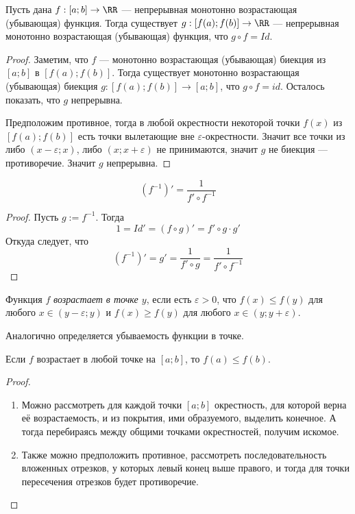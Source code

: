 \documentclass[12pt,a4paper]{article}
\begin{document}
    \begin{lemma}
        Пусть дана $f: [a; b] \to \RR$ --- непрерывная монотонно возрастающая (убывающая) функция. Тогда существует $g: [f(a); f(b)] \to \RR$ --- непрерывная монотонно возрастающая (убывающая) функция, что $g \circ f = Id$.
    \end{lemma}

    \begin{proof}
        Заметим, что $f$ --- монотонно возрастающая (убывающая) биекция из $[a; b]$ в $[f(a); f(b)]$. Тогда существует монотонно возрастающая (убывающая) биекция $g: [f(a); f(b)] \to [a; b]$, что $g \circ f = id$. Осталось показать, что $g$ непрерывна.

        Предположим противное, тогда в любой окрестности некоторой точки $f(x)$ из $[f(a); f(b)]$ есть точки вылетающие вне $\varepsilon$-окрестности. Значит все точки из либо $(x - \varepsilon; x)$, либо $(x; x + \varepsilon)$ не принимаются, значит $g$ не биекция --- противоречие. Значит $g$ непрерывна.
    \end{proof}

    \begin{lemma}
        \[(f^{-1})' = \frac{1}{f' \circ f^{-1}}\]
    \end{lemma}

    \begin{proof}
        Пусть $g := f^{-1}$. Тогда
        \[1 = Id' = (f \circ g)' = f' \circ g \cdot g'\]
        Откуда следует, что
        \[(f^{-1})' = g' = \frac{1}{f' \circ g} = \frac{1}{f' \circ f^{-1}}\]
    \end{proof}

    \begin{definition}
        Функция $f$ \emph{возрастает в точке $y$}, если есть $\varepsilon > 0$, что $f(x) \leqslant f(y)$ для любого $x \in (y-\varepsilon; y)$ и $f(x) \geqslant f(y)$ для любого $x \in (y; y+\varepsilon)$.

        Аналогично определяется убываемость функции в точке.
    \end{definition}

    \begin{lemma}
        Если $f$ возрастает в любой точке на $[a;b]$, то $f(a) \leqslant f(b)$.
    \end{lemma}

    \begin{proof}
        \begin{enumerate}\ 
            \item Можно рассмотреть для каждой точки $[a; b]$ окрестность, для которой верна её возрастаемость, и из покрытия, ими образуемого, выделить конечное. А тогда перебираясь между общими точками окрестностей, получим искомое.
            \item Также можно предположить противное, рассмотреть последовательность вложенных отрезков, у которых левый конец выше правого, и тогда для точки пересечения отрезков будет противоречие.
        \end{enumerate}
    \end{proof}
\end{document}
